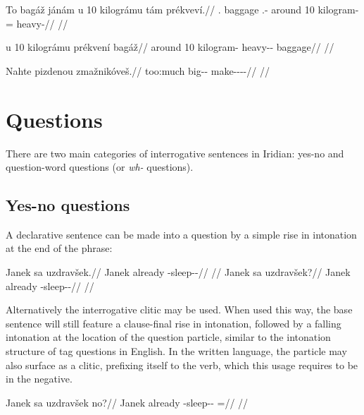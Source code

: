 \ex
\begingl
\gla To bagáž jánám u 10 kilográmu tám prékvev\'i.//
\glb \Dem{}.\Prox{} baggage \Dem{}.\Med{}-\Agt{} around 10 kilogram-\Ins{} \Comp{}= heavy-\Cont{}//
\glft {}//
\endgl
\xe

\ex
\begingl
\gla u 10 kilográmu prékvení bagáž//
\glb around 10 kilogram-\Ins{} heavy-\Comp{}-\Att{} baggage//
\glft {}//
\endgl
\xe

\ex
\begingl
\gla Nahte pizdenou zmažnikóveš.//
\glb too:much big-\Comp{}-\Nz{} make-\Pv{}-\Pf{}-\Nz{}-\Second{}\Sg{}//
\glft {}//
\endgl
\xe

\section{Questions}

There are two  main  categories  of  interrogative  sentences in Iridian: yes-no  and  question-word questions (or \emph{wh-} questions).

\subsection{Yes-no questions}

A declarative sentence can be made into a question by a simple rise in intonation at the end of the phrase:

\pex
\a
\begingl
\gla Janek sa uzdravšek.//
\glb Janek already \Refl{}-sleep-\Av{}-\Pf{}//
\glft {}//
\endgl
\a
\begingl
\gla Janek sa uzdravšek?//
\glb Janek already \Refl{}-sleep-\Av{}-\Pf{}//
\glft {}//
\endgl
\xe

Alternatively the interrogative clitic  may be used. When used this way, the base sentence will still feature a clause-final rise in intonation, followed by a falling intonation at the location of the question particle, similar to the intonation structure of tag questions in English. In the written language, the particle  may also surface as a clitic, prefixing itself to the verb, which this usage requires to be in the negative.

\pex
\begingl
\gla Janek sa uzdravšek no?//
\glb Janek already \Refl{}-sleep-\Av{}-\Pf{} =\Q{}//
\glft {}//
\endgl
\xe

